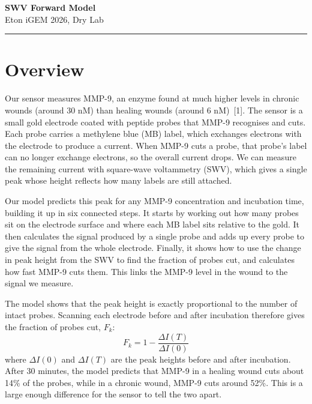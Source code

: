 \documentclass[10pt,a4paper]{article}
\numberwithin{equation}{section}
\newcommand{\cit}[1]{[#1]}
\begin{document}
\begin{center}
{\LARGE\bfseries SWV Forward Model}\\[0.25em]
{\small\color{gray}Eton iGEM 2026, Dry Lab}
\end{center}
\vspace{0.4em}\hrule\vspace{0.7em}

\section*{Overview}

Our sensor measures MMP-9, an enzyme found at much higher levels in chronic wounds (around 30 nM) than healing wounds (around 6 nM)~\cit{1}. The sensor is a small gold electrode coated with peptide probes that MMP-9 recognises and cuts. Each probe carries a methylene blue (MB) label, which exchanges electrons with the electrode to produce a current. When MMP-9 cuts a probe, that probe's label can no longer exchange electrons, so the overall current drops. We can measure the remaining current with square-wave voltammetry (SWV), which gives a single peak whose height reflects how many labels are still attached.

Our model predicts this peak for any MMP-9 concentration and incubation time, building it up in six connected steps. It starts by working out how many probes sit on the electrode surface and where each MB label sits relative to the gold. It then calculates the signal produced by a single probe and adds up every probe to give the signal from the whole electrode. Finally, it shows how to use the change in peak height from the SWV to find the fraction of probes cut, and calculates how fast MMP-9 cuts them. This links the MMP-9 level in the wound to the signal we measure.

The model shows that the peak height is exactly proportional to the number of intact probes. Scanning each electrode before and after incubation therefore gives the fraction of probes cut, $F_k$:
\[
F_k = 1 - \frac{\Delta I(T)}{\Delta I(0)}
\]
where $\Delta I(0)$ and $\Delta I(T)$ are the peak heights before and after incubation. After 30 minutes, the model predicts that MMP-9 in a healing wound cuts about 14\% of the probes, while in a chronic wound, MMP-9 cuts around 52\%. This is a large enough difference for the sensor to tell the two apart.

\end{document}
